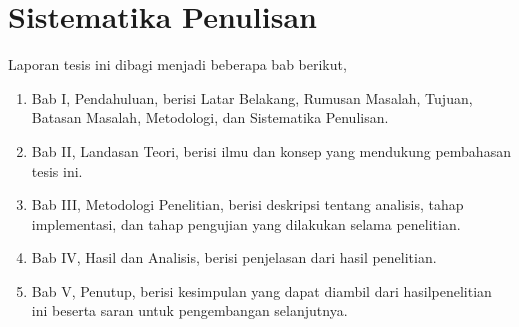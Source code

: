 \section{Sistematika Penulisan}\label{sec:sistematika-penulisan}

Laporan tesis ini dibagi menjadi beberapa bab berikut,
\begin{enumerate}
	\item Bab I, Pendahuluan, berisi Latar Belakang, Rumusan Masalah, Tujuan, Batasan Masalah, Metodologi, dan Sistematika Penulisan.
	\item Bab II, Landasan Teori, berisi ilmu dan konsep yang mendukung pembahasan tesis ini.
	\item Bab III, Metodologi Penelitian, berisi deskripsi tentang analisis, tahap implementasi, dan tahap pengujian yang dilakukan selama penelitian.
	\item Bab IV, Hasil dan Analisis, berisi penjelasan dari hasil penelitian.
	\item Bab V, Penutup, berisi kesimpulan yang dapat diambil dari hasil\linebreak penelitian ini beserta saran untuk pengembangan selanjutnya. 
\end{enumerate}